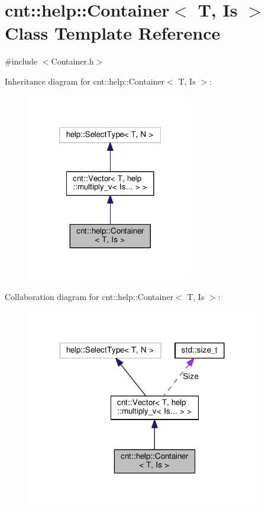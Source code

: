 \hypertarget{classcnt_1_1help_1_1Container}{}\section{cnt\+:\+:help\+:\+:Container$<$ T, Is $>$ Class Template Reference}
\label{classcnt_1_1help_1_1Container}


{\ttfamily \#include $<$Container.\+h$>$}



Inheritance diagram for cnt\+:\+:help\+:\+:Container$<$ T, Is $>$\+:\nopagebreak
\begin{figure}[H]
\begin{center}
\leavevmode
\includegraphics[width=208pt]{classcnt_1_1help_1_1Container__inherit__graph}
\end{center}
\end{figure}


Collaboration diagram for cnt\+:\+:help\+:\+:Container$<$ T, Is $>$\+:\nopagebreak
\begin{figure}[H]
\begin{center}
\leavevmode
\includegraphics[width=288pt]{classcnt_1_1help_1_1Container__coll__graph}
\end{center}
\end{figure}
